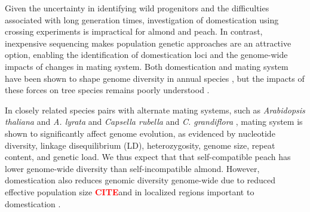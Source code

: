 \documentclass[12pt]{article}
\newcommand{\citex}{\textcolor{red}{\bf CITE}}
\begin{document}
%
Given the uncertainty in identifying wild progenitors and the difficulties associated with long generation times, investigation of domestication using crossing experiments is impractical for almond and peach.
%
In contrast, inexpensive sequencing makes population genetic approaches \citep[c.f.][]{ross2007plant} are an attractive option, enabling the identification of domestication loci and the genome-wide impacts of changes in mating system.   
%
Both domestication and mating system have been shown to shape genome diversity in annual species \citep{glemin2006impact, doebley2006molecular, slotte2013capsella}, but the impacts of these forces on tree species remains poorly understood \citep{mckey2010evolutionary, miller2011forest}.


In closely related species pairs with alternate mating systems, such as \emph{Arabidopsis thaliana} and \emph{A. lyrata} and \emph{Capsella rubella} and \emph{C. grandiflora} \citep{slotte2013capsella}, mating system is shown to significantly affect genome evolution, as evidenced by nucleotide diversity, linkage disequilibrium (LD), heterozygosity, genome size, repeat content, and genetic load.
%
We thus expect that that self-compatible peach has lower genome-wide diversity than self-incompatible almond.
%
However, domestication also reduces genomic diversity genome-wide due to reduced effective population size \citex and in localized regions important to domestication \citep{glemin2006impact, doebley2006molecular}. 
%
%
%
%
\end{document}
